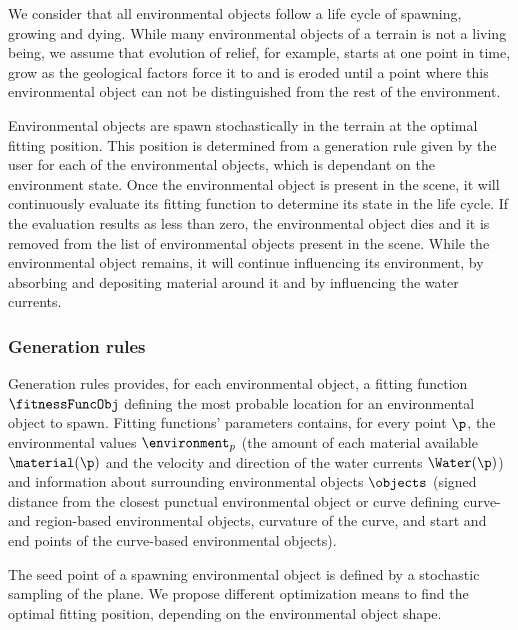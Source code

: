 We consider that all environmental objects follow a life cycle of spawning, growing and dying. While many environmental objects of a terrain is not a living being, we assume that evolution of relief, for example, starts at one point in time, grow as the geological factors force it to and is eroded until a point where this environmental object can not be distinguished from the rest of the environment. 

Environmental objects are spawn stochastically in the terrain at the optimal fitting position. This position is determined from a generation rule given by the user for each of the environmental objects, which is dependant on the environment state.
Once the environmental object is present in the scene, it will continuously evaluate its fitting function to determine its state in the life cycle. If the evaluation results as less than zero, the environmental object dies and it is removed from the list of environmental objects present in the scene. While the environmental object remains, it will continue influencing its environment, by absorbing and depositing material around it and by influencing the water currents. 

\subsubsection{Generation rules}
\label{sec:env-obj_generation-rules}
Generation rules provides, for each environmental object, a fitting function $\fitnessFuncObj$ defining the most probable location for an environmental object to spawn. Fitting functions' parameters contains, for every point $\p$, the environmental values $\environment_p$ (the amount of each material available $\material(\p)$ and the velocity and direction of the water currents $\Water(\p)$) and information about surrounding environmental objects $\objects$ (signed distance from the closest punctual environmental object or curve defining curve- and region-based environmental objects, curvature of the curve, and start and end points of the curve-based environmental objects).

The seed point of a spawning environmental object is defined by a stochastic sampling of the plane. We propose different optimization means to find the optimal fitting position, depending on the environmental object shape.

